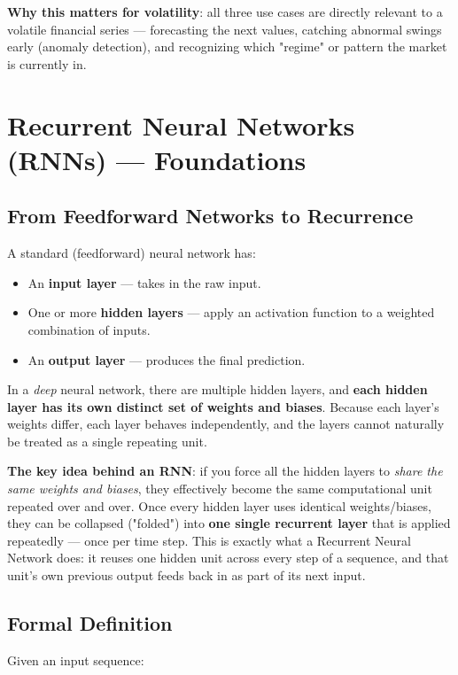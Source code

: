 \documentclass[12pt,openany]{book}
\theoremstyle{definition}
\theoremstyle{remark}
\begin{document}
\textbf{Why this matters for volatility}: all three use cases are directly relevant to a volatile financial series --- forecasting the next values, catching abnormal swings early (anomaly detection), and recognizing which "regime" or pattern the market is currently in.

\section{Recurrent Neural Networks (RNNs) --- Foundations}

\subsection{From Feedforward Networks to Recurrence}

A standard (feedforward) neural network has:
\begin{itemize}
\item An \textbf{input layer} --- takes in the raw input.
\item One or more \textbf{hidden layers} --- apply an activation function to a weighted combination of inputs.
\item An \textbf{output layer} --- produces the final prediction.

\end{itemize}
In a \emph{deep} neural network, there are multiple hidden layers, and \textbf{each hidden layer has its own distinct set of weights and biases}. Because each layer's weights differ, each layer behaves independently, and the layers cannot naturally be treated as a single repeating unit.

\textbf{The key idea behind an RNN}: if you force all the hidden layers to \emph{share the same weights and biases}, they effectively become the same computational unit repeated over and over. Once every hidden layer uses identical weights/biases, they can be collapsed ("folded") into \textbf{one single recurrent layer} that is applied repeatedly --- once per time step. This is exactly what a Recurrent Neural Network does: it reuses one hidden unit across every step of a sequence, and that unit's own previous output feeds back in as part of its next input.

\subsection{Formal Definition}

Given an input sequence:
\end{document}
